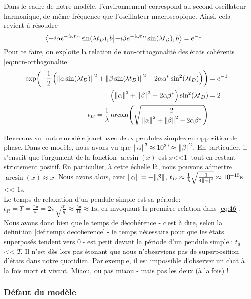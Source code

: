 \documentclass[11pt,oneside,a4paper]{article}
\begin{document}
Dans le cadre de notre modèle, l'environnement correspond au second oscillateur harmonique, de même fréquence que l'oscillateur macroscopique. Ainsi, cela revient à résoudre
\begin{align}
  \braket{-i\alpha e^{-i\omega t_D}\sin(\lambda t_D),b}{-i\beta e^{-i\omega t_D}\sin(\lambda t_D),b} &= e^{-1}\notag
\end{align}
Pour ce faire, on exploite la relation de non-orthogonalité des états cohérents \eqref{eq:non-orthogonalite}
\begin{align}
  \exp(-\frac{1}{2}\left(\norm{\alpha\sin(\lambda t_D)}^2+\norm{\beta\sin(\lambda t_D)}^2+2\alpha\alpha^*\sin^2(\lambda t_D)\right)) &= e^{-1}\notag\\
  \left(\norm{\alpha}^2+\norm{\beta}^2-2\alpha\beta^*\right)\sin^2(\lambda t_D) &= 2\label{eq: decoherence periodique}\\
  t_D = \frac{1}{\lambda}\arcsin(\sqrt{\frac{2}{\norm{\alpha}^2+\norm{\beta}^2-2\alpha\beta^*}})&\label{eq:decoherence time general}
\end{align}

Revenons sur notre modèle jouet avec deux pendules simples en opposition de phase. Dans ce modèle, nous avons vu que $\norm{\alpha}^2\approx 10^{30}\approx\norm{\beta}^2$. En particulier, il s'ensuit que l'argument de la fonction $\arcsin(x)$ est $x$<<$1$, tout en restant strictement positif. En particulier, à cette échelle là, nous pouvons admettre $\arcsin(x)\approx x$. Nous avons alors, avec $\norm{\alpha}=-\norm{\beta}$, $t_D \approx \frac{1}{\lambda}\sqrt{\frac{1}{4\norm{\alpha}^2}}\approx 10^{-15}\unit{\second}$ << $1\unit{\second}$.\\

Le temps de relaxation d'un pendule simple est sa période: $t_R=T=\frac{2\pi}{\omega}=2\pi\sqrt{\frac{L}{g}}\approx \frac{2\pi}{10}\approx1\unit{\second}$, en invoquant la première relation dans \eqref{eq:46}.\\

Nous avons donc bien que le temps de décohérence - c'est à dire, selon la définition \ref{def:temps decoherence} - le temps nécessaire pour que les états superposés tendent vers 0 - est petit devant la période d'un pendule simple : $t_d$ << $T$. Il n'est dès lors pas étonant que nous n'observions pas de superposition d'états dans notre quotidien. Par exemple, il est impossible d'observer un chat à la fois mort et vivant. Miaou, ou pas miaou - mais pas les deux (à la fois) !


\subsubsection{Défaut du modèle}
\end{document}
